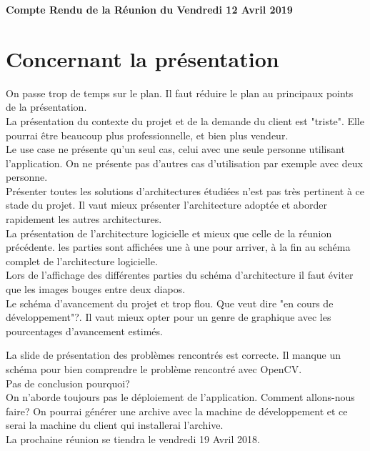 \documentclass[]{article}
\begin{document}
\pagestyle{fancy}
\renewcommand\headrulewidth{1pt}
\renewcommand\footrulewidth{1pt}

\begin{center}
\large{\textbf{Compte Rendu de la Réunion du Vendredi 12 Avril 2019 \bigbreak}}
\end{center}

\section{Concernant la présentation}
On passe trop de temps sur le plan. Il faut réduire le plan au principaux points de la présentation.\\

La présentation du contexte du projet et de la demande du client est "triste". Elle pourrai être beaucoup plus professionnelle, et bien plus vendeur.\\

Le use case ne présente qu'un seul cas, celui avec une seule personne utilisant  l'application. On ne présente pas d'autres cas d'utilisation par exemple avec deux personne.\\
Présenter toutes les solutions d'architectures étudiées n'est pas très pertinent à ce stade du projet. Il vaut mieux présenter l'architecture adoptée et aborder rapidement les autres architectures.\\

La présentation de l'architecture logicielle et mieux que celle de la réunion précédente. les parties sont affichées une à une pour arriver, à la fin au schéma complet de l'architecture logicielle.\\

Lors de l'affichage des différentes parties du schéma d'architecture il faut éviter que les images bouges entre deux diapos.\\

Le schéma d'avancement du projet et trop flou. Que veut dire "en cours de développement"?. Il vaut mieux opter pour un genre de graphique avec les pourcentages d'avancement estimés.

La slide de présentation des problèmes rencontrés est correcte. Il manque un schéma pour bien comprendre le problème rencontré avec OpenCV.\\

Pas de conclusion pourquoi?\\

On n'aborde toujours pas le déploiement de l'application.
Comment allons-nous faire?
On pourrai générer une archive avec la machine de développement et ce serai la machine du client qui installerai l'archive.\\

La prochaine réunion se tiendra le vendredi 19 Avril 2018.
\end{document}
